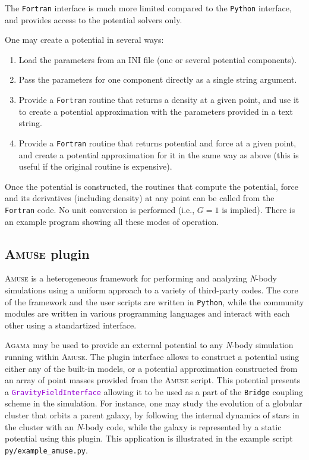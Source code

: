 \documentclass[12pt]{article}
\newcommand{\Agama}{\textsc{Agama}\xspace}
\newcommand{\Amuse}{\textsc{Amuse}\xspace}
\newcommand{\Nbody}{\textsl{N}-body\xspace}
\newcommand{\Python}{\texttt{Python}\xspace}
\newcommand{\Fortran}{\texttt{Fortran}\xspace}
\newcommand{\ttt}[1]{\textcolor{darkviolet}{\texttt{#1}}}
\begin{document}
The \Fortran interface is much more limited compared to the \Python interface, and provides access to the potential solvers only. 

One may create a potential in several ways:
\begin{enumerate}  \setlength{\parskip}{2pt} \setlength{\itemsep}{2pt}
\item Load the parameters from an INI file (one or several potential components).
\item Pass the parameters for one component directly as a single string argument.
\item Provide a \Fortran routine that returns a density at a given point, and use it to create a potential approximation with the parameters provided in a text string.
\item Provide a \Fortran routine that returns potential and force at a given point, and create a potential approximation for it in the same way as above (this is useful if the original routine is expensive).
\end{enumerate}
Once the potential is constructed, the routines that compute the potential, force and its derivatives (including density) at any point can be called from the \Fortran code. No unit conversion is performed (i.e., $G=1$ is implied).
There is an example program showing all these modes of operation.

\subsection{\Amuse plugin}  \label{sec:Amuse}

\Amuse \cite{PortegiesZwart2013} is a heterogeneous framework for performing and analyzing \Nbody simulations using a uniform approach to a variety of third-party codes. The core of the framework and the user scripts are written in \Python, while the community modules are written in various programming languages and interact with each other using a standartized interface.

\Agama may be used to provide an external potential to any \Nbody simulation running within \Amuse. The plugin interface allows to construct a potential using either any of the built-in models, or a potential approximation constructed from an array of point masses provided from the \Amuse script. This potential presents a \ttt{GravityFieldInterface} allowing it to be used as a part of the \texttt{Bridge} coupling scheme in the simulation. For instance, one may study the evolution of a globular cluster that orbits a parent galaxy, by following the internal dynamics of stars in the cluster with an \Nbody code, while the galaxy is represented by a static potential using this plugin. This application is illustrated in the example script \texttt{py/example_amuse.py}.
\end{document}
